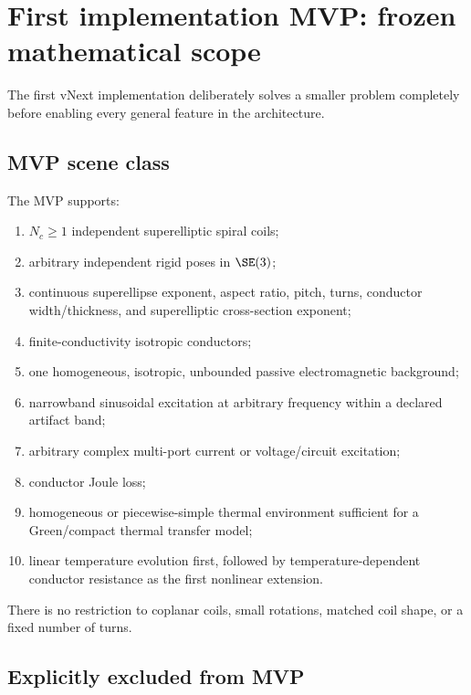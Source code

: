 \section{First implementation MVP: frozen mathematical scope}
\label{sec:mvp}

The first vNext implementation deliberately solves a smaller problem completely
before enabling every general feature in the architecture.

\subsection{MVP scene class}

The MVP supports:
\begin{enumerate}
\item $N_c\ge1$ independent superelliptic spiral coils;
\item arbitrary independent rigid poses in $\SE(3)$;
\item continuous superellipse exponent, aspect ratio, pitch, turns, conductor
      width/thickness, and superelliptic cross-section exponent;
\item finite-conductivity isotropic conductors;
\item one homogeneous, isotropic, unbounded passive electromagnetic background;
\item narrowband sinusoidal excitation at arbitrary frequency within a declared
      artifact band;
\item arbitrary complex multi-port current or voltage/circuit excitation;
\item conductor Joule loss;
\item homogeneous or piecewise-simple thermal environment sufficient for a
      Green/compact thermal transfer model;
\item linear temperature evolution first, followed by temperature-dependent
      conductor resistance as the first nonlinear extension.
\end{enumerate}

There is no restriction to coplanar coils, small rotations, matched coil shape,
or a fixed number of turns.

\subsection{Explicitly excluded from MVP}

